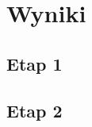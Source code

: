 \section{Wyniki}\label{section_results}
\subsection{Etap 1}\label{section_results_step1}
\subsection{Etap 2}\label{section_results_step2}